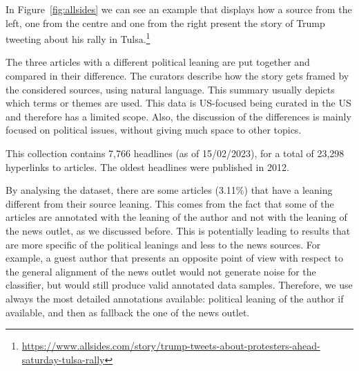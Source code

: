In Figure~\ref{fig:allsides} we can see an example that displays how a source from the left, one from the centre and one from the right present the story of Trump tweeting about his rally in Tulsa.\footnote{\url{https://www.allsides.com/story/trump-tweets-about-protesters-ahead-saturday-tulsa-rally}}



The three articles with a different political leaning are put together and compared in their difference.
The curators describe how the story gets framed by the considered sources, using natural language.
This summary usually depicts which terms or themes are used. %
This data is US-focused being curated in the US and therefore has a limited scope. Also, the discussion of the differences is mainly focused on political issues, without giving much space to other topics.




This collection contains 7,766 headlines (as of 15/02/2023), for a total of 23,298 hyperlinks to articles.
The oldest headlines were published in 2012.

By analysing the dataset, there are some articles (3.11\%) %
that have a leaning different from their source leaning.
This comes from the fact that some of the articles are annotated with the leaning of the author and not with the leaning of the news outlet, as we discussed before.
This is potentially leading to results that are more specific of the political leanings and less to the news sources. For example, a guest author that presents an opposite point of view with respect to the general alignment of the news outlet would not generate noise for the classifier, but would still produce valid annotated data samples.
Therefore, we use always the most detailed annotations available: political leaning of the author if available, and then as fallback the one of the news outlet.

